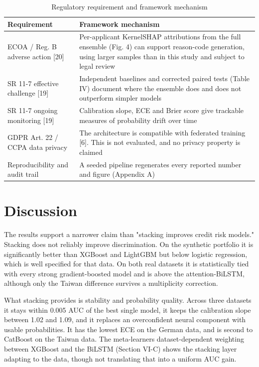 \documentclass[conference,a4paper]{IEEEtran}
\begin{document}
\begin{table}[!t]
\caption{Regulatory requirement and framework mechanism}
\centering
\scriptsize
\renewcommand{\arraystretch}{1.1}
\begin{tabular}{p{}p{}}
\toprule
Requirement & Framework mechanism \\
\midrule
ECOA / Reg. B adverse action [20] & Per-applicant KernelSHAP attributions from the full ensemble (Fig. 4) can support reason-code generation, using larger samples than in this study and subject to legal review \\
SR 11-7 effective challenge [19] & Independent baselines and corrected paired tests (Table IV) document where the ensemble does and does not outperform simpler models \\
SR 11-7 ongoing monitoring [19] & Calibration slope, ECE and Brier score give trackable measures of probability drift over time \\
GDPR Art. 22 / CCPA data privacy & The architecture is compatible with federated training [6]. This is not evaluated, and no privacy property is claimed \\
Reproducibility and audit trail & A seeded pipeline regenerates every reported number and figure (Appendix A) \\
\bottomrule
\end{tabular}
\end{table}

\section{Discussion}

The results support a narrower claim than "stacking improves credit risk models." Stacking does not reliably improve discrimination. On the synthetic portfolio it is significantly better than XGBoost and LightGBM but below logistic regression, which is well specified for that data. On both real datasets it is statistically tied with every strong gradient-boosted model and is above the attention-BiLSTM, although only the Taiwan difference survives a multiplicity correction.

What stacking provides is stability and probability quality. Across three datasets it stays within 0.005 AUC of the best single model, it keeps the calibration slope between 1.02 and 1.09, and it replaces an overconfident neural component with usable probabilities. It has the lowest ECE on the German data, and is second to CatBoost on the Taiwan data. The meta-learner\textquotesingle s dataset-dependent weighting between XGBoost and the BiLSTM (Section VI-C) shows the stacking layer adapting to the data, though not translating that into a uniform AUC gain.
\end{document}
